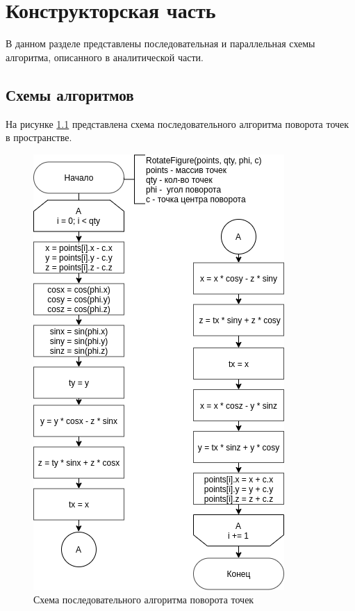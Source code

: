 \chapter{Конструкторская часть}
В данном разделе представлены последовательная и параллель­ная схемы алгоритма, 
описанного в аналитической части.


\section{Схемы алгоритмов}

На рисунке \ref{scheme:serial} представлена схема последовательного алгоритма
поворота точек в пространстве.
\begin{figure}[!htb]
	\centering
	\includegraphics[scale=0.7]{schemes/serial}
	\caption{Схема последовательного алгоритма поворота точек}
	\label{scheme:serial}
\end{figure}

\newpage

